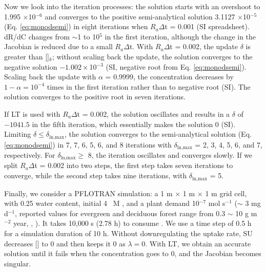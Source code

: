 \documentclass[gmd, manuscript]{copernicus}
\begin{document}
Now we look into the iteration processes: the solution starts with an overshoot
to 1.995 $\times$10$^{-6}$ and converges to the positive semi-analytical solution
3.1127 $\times$10$^{-5}$ (Eq. \ref{eq:monodsemi}) in eight iterations when
$R_a\Delta$t = 0.001 (SI spreadsheet). dR/dC changes from $\sim$1 to 10$^5$
in the first iteration, although the change in the Jacobian is reduced due to a
small $R_a\Delta$t. With $R_a\Delta$t = 0.002, the update $\delta$ is greater
than []$_k$; without scaling back the update, the solution
converges to the negative solution $-1.002\times$10$^{-3}$ (SI,
negative root from Eq. \ref{eq:monodsemi}). Scaling back the update with
$\alpha$ = 0.9999, the concentration decreases by $1 - \alpha = 10^{-4}$ times in
the first iteration rather than to negative root (SI). The
solution converges to the positive root in seven iterations. 

If LT is used with $R_a\Delta$t = 0.002, the solution oscillates and results in
a $\delta$ of $-1041.5$ in the fifth iteration, which essentially makes the solution
0 (SI).   Limiting $\delta \leq \delta_\text{ln,max}$, the
solution converges to the semi-analytical solution (Eq.\ref{eq:monodsemi}) in
7, 7, 6, 5, 6, and 8 iterations with $\delta_\text{ln,max}$ = 2, 3, 4, 5, 6, and
7, respectively.  For $\delta_\text{ln,max}\geq$ 8, the iteration oscillates and
converges slowly.  If we split $R_a\Delta$t = 0.002 into two steps, the first
step takes seven iterations to converge, while the second step takes nine iterations,
with $\delta_\text{ln,max}$ = 5. %

Finally, we consider a PFLOTRAN simulation: a 1 m $\times$ 1 m $\times$ 1 m
grid cell, with 0.25 water content, initial 4 \unit{\mu M} , and a
plant  demand 10$^{-7}$ mol s$^{-1}$ ($\sim$ 3 mg d$^{-1}$,
reported values for evergreen and deciduous forest range from 0.3 $\sim$ 10 g
m$^{-2}$ year, \citeauthor{Chapin2011}, \citeyear{Chapin2011}). It takes 10,000
\unit{s} (2.78 \unit{h}) to
consume . We use a time step of 0.5 \unit{h} for a simulation
duration of 10 \unit{h}. Without downregulating the uptake rate, SU decreases
[] to 0 and then keeps it 0 as $\lambda=0$. With LT, we obtain an
accurate solution until it fails when the concentration goes to 0, and the
Jacobian becomes singular. 
\end{document}
